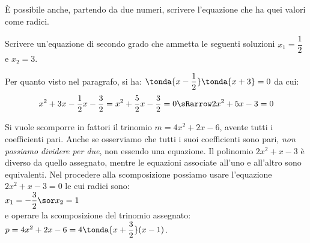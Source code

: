 % 
% 
% 

È possibile anche, partendo da due numeri, scrivere l'equazione che ha quei 
valori come radici.

\begin{esempio}{}{}
Scrivere un'equazione di secondo grado che ammetta le seguenti soluzioni 
\(x_1 = \dfrac{1}{2}\) \quad e \quad \(x_2 = 3\).

Per quanto visto nel paragrafo, si ha: 
\(\tonda{x-\dfrac{1}{2} } \tonda{x +3 }=0\) da cui: 
\[x^2 +3 x-\dfrac{1}{2} x -\dfrac{3}{2} = 
x^2 +\dfrac{5}{2} x -\dfrac{3}{2} = 0 \sRarrow 2x^2 +5x -3 = 0\]
\end{esempio}


\begin{osservazione}{}{}
Si vuole scomporre in fattori il trinomio \(m = 4 x^2 +2 x -6\), avente 
tutti 
i coefficienti pari. Anche se osserviamo che tutti i suoi coefficienti sono 
pari, \emph{non possiamo dividere per due}, non essendo una equazione. 
Il polinomio \(2 x^2 +x -3\) è diverso da quello assegnato, mentre le
equazioni associate all'uno e all'altro sono equivalenti. 
Nel procedere alla scomposizione possiamo usare l'equazione 
\(2 x^2 +x -3 = 0\) le cui radici sono:\\
\(x_1 = -\dfrac{3}{2} \sor x_2 = 1\) \\
e operare la scomposizione del trinomio assegnato: \\
\(p = 4 x^2 +2 x -6 = 4 \tonda{x +\dfrac{3}{2} } ( x -1)\).
\end{osservazione}


